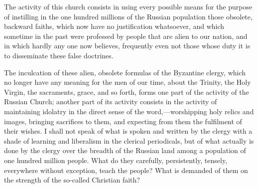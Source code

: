 \documentclass{book}
\begin{document}
The activity of this church consists in using every possible means for the purpose of instilling in the one hundred millions of the Russian population those obsolete, backward faiths, which now have no justification whatsoever, and which sometime in the past were professed by people that are alien to our nation, and in which hardly any one now believes, frequently even not those whose duty it is to disseminate these false doctrines.

The inculcation of these alien, obsolete formulas of the Byzantine clergy, which no longer have any meaning for the men of our time, about the Trinity, the Holy Virgin, the sacraments, grace, and so forth, forms one part of the activity of the Russian Church; another part of its activity consists in the activity of maintaining idolatry in the direct sense of the word,—worshipping holy relics and images, bringing sacrifices to them, and expecting from them the fulfilment of their wishes. I shall not speak of what is spoken and written by the clergy with a shade of learning and liberalism in the clerical periodicals, but of what actually is done by the clergy over the breadth of the Russian land among a population of one hundred million people. What do they carefully, persistently, tensely, everywhere without exception, teach the people? What is demanded of them on the strength of the so-called Christian faith?
\end{document}
